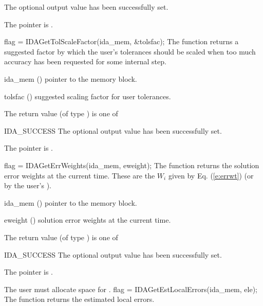{{\begin{args}
    The optional output value has been successfully set.
  \item[\Id{IDA\_MEM\_NULL}]
    The  pointer is .
  \end{args}
}
{}
{
  flag = IDAGetTolScaleFactor(ida\_mem, \&tolsfac);
}
{
  The function  returns a
  suggested factor by which the user's tolerances
  should be scaled when too much accuracy has been
  requested for some internal step.
}
{
  \begin{args}[tolsfac]
  \item[ida\_mem] ()
    pointer to the {\idas} memory block.
  \item[tolsfac] ()
    suggested scaling factor for user tolerances.
  \end{args}
}
{
  The return value  (of type ) is one of
  \begin{args}
  \item[IDA\_SUCCESS]
    The optional output value has been successfully set.
  \item[\Id{IDA\_MEM\_NULL}]
    The  pointer is .
  \end{args}
}
{}
{
  flag = IDAGetErrWeights(ida\_mem, eweight);
}
{
  The function  returns the solution error weights
  at the current time. These are the $W_i$ given by Eq. (\ref{e:errwt})
  (or by the user's ).
}
{
  \begin{args}[eweight]
  \item[ida\_mem] ()
    pointer to the {\idas} memory block.
  \item[eweight] ()
    solution error weights at the current time.
  \end{args}
}
{
  The return value  (of type ) is one of
  \begin{args}
  \item[IDA\_SUCCESS]
    The optional output value has been successfully set.
  \item[\Id{IDA\_MEM\_NULL}]
    The  pointer is .
  \end{args}
}
{
  {\warn}The user must allocate space for .
}
{
  flag = IDAGetEstLocalErrors(ida\_mem, ele);
}
{
  The function  returns the estimated local errors.
}
{
  \begin{args}

\end{args}}}
